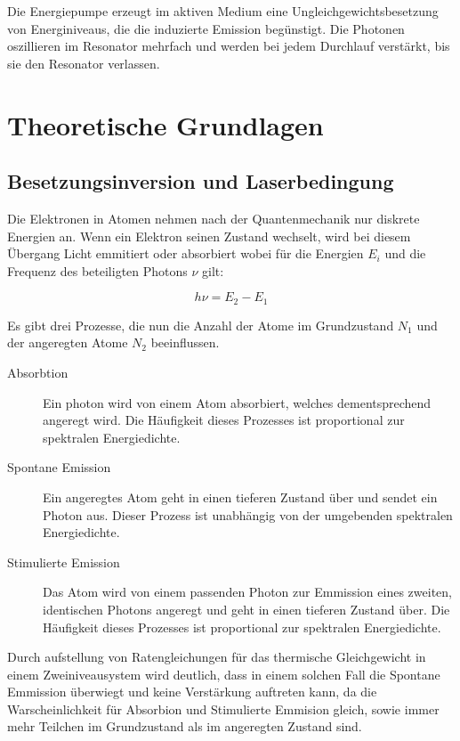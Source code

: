 \documentclass[slug=GL, room=HZDR\ Dresden/Rossendorf\,\ Geb.\ 620/123, supervisor=Martin\ Rehwald;\, Tim\ Ziegler]{../../Lab_Report_LaTeX/lab_report}
\begin{document}
Die Energiepumpe erzeugt im aktiven Medium eine
Ungleichgewichtsbesetzung von Energiniveaus, die die induzierte
Emission beg\"unstigt. Die Photonen oszillieren im Resonator mehrfach
und werden bei jedem Durchlauf verst\"arkt, bis sie den
Resonator verlassen.

\section{Theoretische Grundlagen}%
\label{sec:theo}

\subsection{Besetzungsinversion und Laserbedingung}%
\label{sec:inv}

Die Elektronen in Atomen nehmen nach der Quantenmechanik nur diskrete
Energien an. Wenn ein Elektron seinen Zustand wechselt, wird bei
diesem \"Ubergang Licht emmitiert oder absorbiert wobei f\"ur die
Energien \(E_i\) und die Frequenz des beteiligten Photons \(\nu\) gilt:

\begin{equation}
  \label{eq:transfreq}
  h\nu = E_2 - E_1
\end{equation}

Es gibt drei Prozesse, die nun die Anzahl der Atome im Grundzustand
\(N_1\) und der angeregten Atome \(N_2\) beeinflussen.

\begin{description}
\item[Absorbtion] Ein photon wird von einem Atom absorbiert, welches
  dementsprechend angeregt wird. Die H\"aufigkeit dieses Prozesses ist
  proportional zur spektralen Energiedichte.
\item[Spontane Emission] Ein angeregtes Atom geht in einen tieferen
  Zustand \"uber und sendet ein Photon aus. Dieser Prozess ist
  unabh\"angig von der umgebenden spektralen Energiedichte.
\item[Stimulierte Emission] Das Atom wird von einem passenden Photon
  zur Emmission eines zweiten, identischen Photons angeregt und geht
  in einen tieferen Zustand \"uber. Die H\"aufigkeit dieses Prozesses ist
  proportional zur spektralen Energiedichte.
\end{description}

Durch aufstellung von Ratengleichungen f\"ur das thermische
Gleichgewicht in einem Zweiniveausystem wird deutlich, dass in einem
solchen Fall die Spontane Emmission \"uberwiegt und keine
Verst\"arkung auftreten kann, da die Warscheinlichkeit f\"ur Absorbion
und Stimulierte Emmision gleich, sowie immer mehr Teilchen im
Grundzustand als im angeregten Zustand sind.
\end{document}

